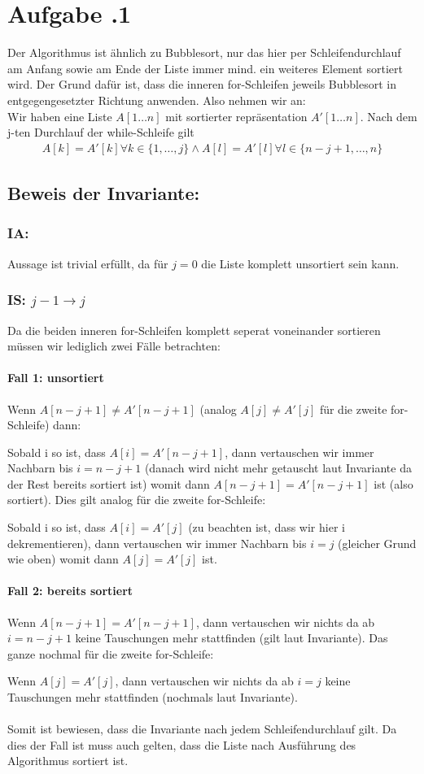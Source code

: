 \newpage
\section*{Aufgabe \bn.1}
Der Algorithmus ist ähnlich zu Bubblesort, nur das hier per Schleifendurchlauf am Anfang sowie am Ende der Liste immer mind. ein weiteres Element sortiert wird. Der Grund dafür ist, dass die inneren for-Schleifen jeweils Bubblesort in entgegengesetzter Richtung anwenden. Also nehmen wir an: \\
Wir haben eine Liste $A[1\dots n]$ mit sortierter repräsentation $A'[1\dots n]$.
Nach dem j-ten Durchlauf der while-Schleife gilt
\begin{align*}
  A[k] = A'[k]\forall k\in\{1,\dots,j\} \land A[l] = A'[l]\forall l\in\{n-j+1,\dots,n\}
\end{align*}
\subsection*{Beweis der Invariante:}
\subsubsection*{IA:}Aussage ist trivial erfüllt, da für $j = 0$ die Liste komplett unsortiert sein kann.
\subsubsection*{IS: $j - 1 \rightarrow  j$} 
Da die beiden inneren for-Schleifen komplett seperat voneinander sortieren müssen wir lediglich zwei Fälle betrachten:
\paragraph*{Fall 1: unsortiert}
Wenn $A[n-j+1]\not= A'[n-j+1]$ (analog $A[j]\not= A'[j]$ für die zweite for-Schleife) dann:

Sobald i so ist, dass $A[i]=A'[n-j+1]$, dann vertauschen wir immer Nachbarn bis $i = n - j + 1$ (danach wird nicht mehr getauscht laut Invariante da der Rest bereits sortiert ist) womit dann $A[n-j+1] = A'[n-j+1]$ ist (also sortiert). Dies gilt analog für die zweite for-Schleife:

Sobald i so ist, dass $A[i]=A'[j]$ (zu beachten ist, dass wir hier i dekrementieren), dann vertauschen wir immer Nachbarn bis $i = j$ (gleicher Grund wie oben) womit dann $A[j] = A'[j]$ ist.
\paragraph*{Fall 2: bereits sortiert} 
Wenn $A[n-j+1] = A'[n-j+1]$, dann vertauschen wir nichts da ab $i = n - j + 1$ keine Tauschungen mehr stattfinden (gilt laut Invariante). Das ganze nochmal für die zweite for-Schleife:

Wenn $A[j] = A'[j]$, dann vertauschen wir nichts da ab $i = j$ keine Tauschungen mehr stattfinden (nochmals laut Invariante). \\\\
Somit ist bewiesen, dass die Invariante nach jedem Schleifendurchlauf gilt. Da dies der Fall ist muss auch gelten, dass die Liste nach Ausführung des Algorithmus sortiert ist.
